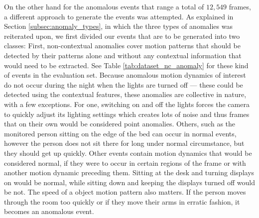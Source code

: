 On the other hand for the anomalous events that range a total of $12,549$ frames, a different approach to generate the events was attempted. As explained in Section \ref{subsec:anomaly_types}, in which the three types of anomalies was reiterated upon, we first divided our events that are to be generated into two classes: First, non-contextual anomalies cover motion patterns that should be detected by their patterns alone and without any contextual information that would need to be extracted. See Table \ref{tab:dataset_nc_anomaly} for these kind of events in the evaluation set. Because anomalous motion dynamics of interest do not occur during the night when the lights are turned off --- these could be detected using the contextual features, these anomalies are collective in nature, with a few exceptions. For one, switching on and off the lights forces the camera to quickly adjust its lighting settings which creates lots of noise and thus frames that on their own would be considered point anomalies. Others, such as the monitored person sitting on the edge of the bed can occur in normal events, however the person does not sit there for long under normal circumstance, but they should get up quickly. Other events contain motion dynamics that would be considered normal, if they were to occur in certain regions of the frame or with another motion dynamic preceding them. Sitting at the desk and turning displays on would be normal, while sitting down and keeping the displays turned off would be not. The speed of a object motion pattern also matters. If the person moves through the room too quickly or if they move their arms in erratic fashion, it becomes an anomalous event.

